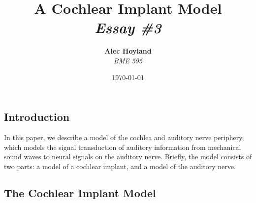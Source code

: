 \documentclass[12pt]{diazessay} %
\title{\textbf{A Cochlear Implant Model} \\ {\Large\itshape Essay \#3}} %
\author{\textbf{Alec Hoyland} \\ \textit{BME 595}} %
\date{\today} %
\begin{document}
\maketitle %





\vspace{30pt} %


\subsection*{Introduction}

In this paper, we describe a model of the cochlea and auditory nerve periphery, which models the signal transduction of auditory
information from mechanical sound waves to neural signals on the auditory nerve.
Briefly, the model consists of two parts: a model of a cochlear implant, and a model of the auditory nerve.

\subsection*{The Cochlear Implant Model}
\end{document}
